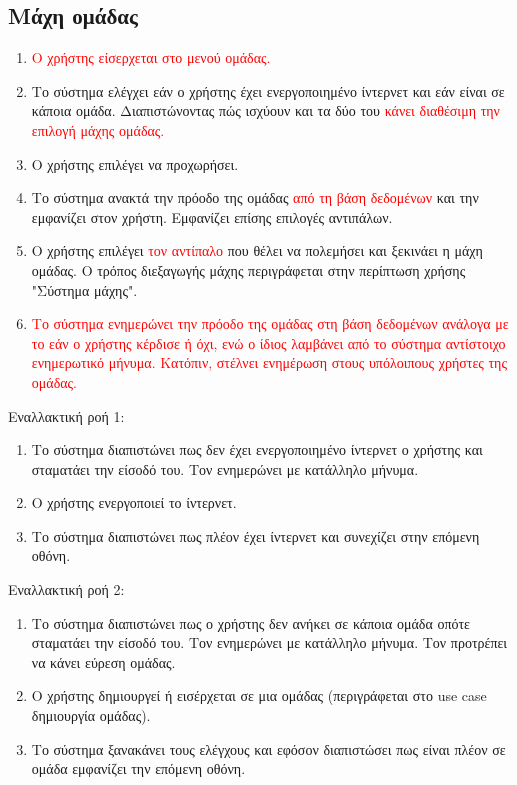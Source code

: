 \subsection{Μάχη ομάδας}
\label{sec:clanbattle}
\begin{enumerate}
\item \textcolor{red}{Ο χρήστης είσερχεται στο μενού ομάδας.}
\item Το σύστημα ελέγχει εάν ο χρήστης έχει ενεργοποιημένο ίντερνετ και εάν είναι σε κάποια ομάδα. Διαπιστώνοντας πώς ισχύουν και τα δύο του \textcolor{red}{κάνει διαθέσιμη την επιλογή μάχης ομάδας.}
\item Ο χρήστης επιλέγει να προχωρήσει.
\item Το σύστημα ανακτά την πρόοδο της ομάδας \textcolor{red}{από τη βάση δεδομένων} και την εμφανίζει στον χρήστη. Εμφανίζει επίσης επιλογές αντιπάλων.
\item Ο χρήστης επιλέγει \textcolor{red}{τον αντίπαλο} που θέλει να πολεμήσει και ξεκινάει η μάχη ομάδας. Ο τρόπος διεξαγωγής μάχης περιγράφεται στην περίπτωση χρήσης "Σύστημα μάχης".
\item \textcolor{red}{Το σύστημα ενημερώνει την πρόοδο της ομάδας στη βάση δεδομένων ανάλογα με το εάν ο χρήστης κέρδισε ή όχι, ενώ ο ίδιος λαμβάνει από το σύστημα αντίστοιχο ενημερωτικό μήνυμα. Κατόπιν, στέλνει ενημέρωση στους υπόλοιπους χρήστες της ομάδας.}
\end{enumerate}

Εναλλακτική ροή 1:
\begin{enumerate}[label=2.\alph*.,ref=2.\alph*]
\item Το σύστημα διαπιστώνει πως δεν έχει ενεργοποιημένο ίντερνετ ο χρήστης και σταματάει την είσοδό του. Τον ενημερώνει με κατάλληλο μήνυμα.
\item Ο χρήστης ενεργοποιεί το ίντερνετ.
\item Το σύστημα διαπιστώνει πως πλέον έχει ίντερνετ και συνεχίζει στην επόμενη οθόνη.
\end{enumerate}

Εναλλακτική ροή 2:
\begin{enumerate}[label=2.\alph*.,ref=2.\alph*]
\item Το σύστημα διαπιστώνει πως ο χρήστης δεν ανήκει σε κάποια ομάδα οπότε σταματάει την είσοδό του. Τον ενημερώνει με κατάλληλο μήνυμα. Τον προτρέπει να κάνει εύρεση ομάδας.
\item Ο χρήστης δημιουργεί ή εισέρχεται σε μια ομάδας (περιγράφεται στο use case δημιουργία ομάδας).
\item Το σύστημα ξανακάνει τους ελέγχους και εφόσον διαπιστώσει πως είναι πλέον σε ομάδα εμφανίζει την επόμενη οθόνη.
\end{enumerate}

